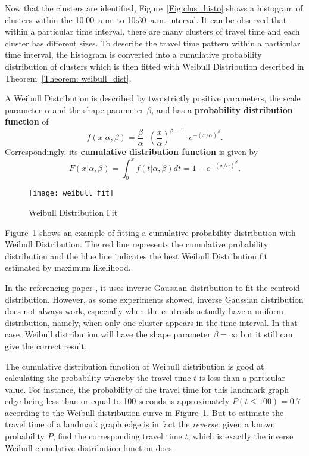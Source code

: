 Now that the clusters are identified, Figure~\ref{Fig:clus_histo} shows a histogram of clusters within the 10:00~a.m. to 10:30~a.m. interval. It can be observed that within a particular time interval, there are many clusters of travel time and each cluster has different sizes. To describe the travel time pattern within a particular time interval, the histogram is converted into a cumulative probability distribution of clusters which is then fitted with Weibull Distribution described in Theorem~\ref{Theorem: weibull_dist}. 

\begin{theorem}\label{Theorem: weibull_dist}
A Weibull Distribution is described by two strictly positive parameters, the scale parameter $\alpha$ and the shape parameter $\beta$, and has a \textbf{probability distribution function} of \cite{WEDI}
\begin{equation}
f(x | \alpha, \beta) = \frac{\beta}{\alpha}\cdot(\frac{x}{\alpha})^{\beta - 1}\cdot e^{-(x / \alpha)^{\beta}}.
\end{equation}
Correspondingly, its \textbf{cumulative distribution function} is given by \cite{WEIB}
\begin{equation}
F(x | \alpha, \beta) = \int_{0}^{x} f(t | \alpha, \beta) dt = 1 - e^{-(x / \alpha)^{\beta}}.
\end{equation}
\end{theorem}

\begin{figure}[h!]
\texttt{[image: weibull\_fit]}
\centering
\caption{Weibull Distribution Fit}\label{Fig:weibull_fit}
\end{figure}

Figure~\ref{Fig:weibull_fit} shows an example of fitting a cumulative probability distribution with Weibull Distribution. The red line represents the cumulative probability distribution and the blue line indicates the best Weibull Distribution fit estimated by maximum likelihood. 

In the referencing paper \cite{TDR10}, it uses inverse Gaussian distribution to fit the centroid distribution. However, as some experiments showed, inverse Gaussian distribution does not always work, especially when the centroids actually have a uniform distribution, namely, when only one cluster appears in the time interval. In that case, Weibull distribution will have the shape parameter $\beta = \infty$ but it still can give the correct result. 

The cumulative distribution function of Weibull distribution is good at calculating the probability whereby the travel time $t$ is less than a particular value. For instance, the probability of the travel time for this landmark graph edge being less than or equal to 100 seconds is approximately $P(t\leq100) = 0.7$ according to the Weibull distribution curve in Figure~\ref{Fig:weibull_fit}. But to estimate the travel time of a landmark graph edge is in fact the \emph{reverse}: given a known probability $P$, find the corresponding travel time $t$, which is exactly the inverse Weibull cumulative distribution function does. 

